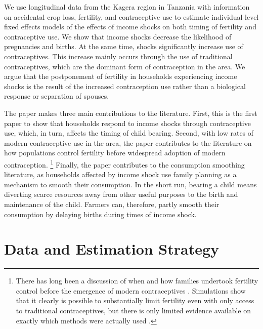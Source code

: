\documentclass[letterpaper,12pt]{article}
\begin{document}
We use longitudinal data from the Kagera region in Tanzania with information on 
accidental crop loss, fertility, and contraceptive use to estimate individual 
level fixed effects models of the effects of income shocks on both timing of 
fertility and contraceptive use.
We show that income shocks decrease the likelihood of pregnancies and births.
At the same time, shocks significantly increase use of contraceptives.
This increase mainly occurs through the use of traditional contraceptives, 
which are the dominant form of contraception in the area.
We argue that the postponement of fertility in households experiencing income 
shocks is the result of the increased contraception use rather than a biological 
response or separation of spouses.

The paper makes three main contributions to the literature. 
First, this is the first paper to show that households respond to income shocks 
through contraceptive use, which, in turn, affects the timing of child bearing. 
Second, with low rates of modern contraceptive use in the area, the paper contributes 
to the literature on how populations control fertility before widespread adoption of
modern contraception.%
\footnote{
There has long been a discussion of when and how families 
undertook fertility control before the emergence of modern 
contraceptives \citep{Guinnane2011,Cinnirella2017}.
Simulations show that it clearly is possible to substantially limit fertility
even with only access to traditional contraceptives, but there is only 
limited evidence available on exactly which methods were actually used 
\citep{Michael1976,David1986,Santow1995}.
}
Finally, the paper contributes to the consumption smoothing literature, as households 
affected by income shock use family planning as a mechanism to smooth their consumption. 
In the short run, bearing a child means diverting scarce resources away from other
useful purposes to the birth and maintenance of the child. 
Farmers can, therefore, partly smooth their consumption by delaying births during 
times of income shock.



\section{Data and Estimation Strategy}
\end{document}
